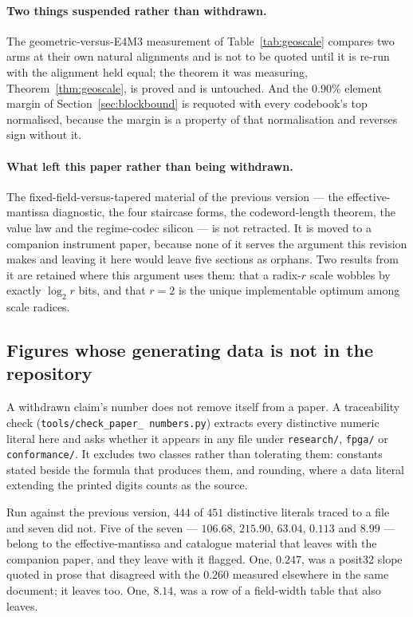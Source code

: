 \documentclass[11pt]{article}
\theoremstyle{definition}
\begin{document}
\paragraph{Two things suspended rather than withdrawn.} The geometric-versus-E4M3
measurement of Table~\ref{tab:geoscale} compares two arms at their own natural
alignments and is not to be quoted until it is re-run with the alignment held
equal; the theorem it was measuring, Theorem~\ref{thm:geoscale}, is proved and is
untouched. And the $0.90\%$ element margin of Section~\ref{sec:blockbound} is
requoted with every codebook's top normalised, because the margin is a property
of that normalisation and reverses sign without it.

\paragraph{What left this paper rather than being withdrawn.} The
fixed-field-versus-tapered material of the previous version --- the
effective-mantissa diagnostic, the four staircase forms, the codeword-length
theorem, the value law and the regime-codec silicon --- is not retracted. It is
moved to a companion instrument paper, because none of it serves the argument
this revision makes and leaving it here would leave five sections as orphans.
Two results from it are retained where this argument uses them: that a radix-$r$
scale wobbles by exactly $\log_2 r$ bits, and that $r=2$ is the unique
implementable optimum among scale radices.

\subsection{Figures whose generating data is not in the repository}
\label{sec:provenance}

A withdrawn claim's number does not remove itself from a paper. A traceability
check (\texttt{tools/\allowbreak check\_\allowbreak paper\_\allowbreak
numbers.py}) extracts every distinctive
numeric literal here and asks whether it appears in any file under
\texttt{research/}, \texttt{fpga/} or \texttt{conformance/}. It excludes two
classes rather than tolerating them: constants stated beside the formula that
produces them, and rounding, where a data literal extending the printed digits
counts as the source.

Run against the previous version, $444$ of $451$ distinctive literals traced to a
file and seven did not. Five of the seven --- $106.68$, $215.90$, $63.04$,
$0.113$ and $8.99$ --- belong to the effective-mantissa and catalogue material
that leaves with the companion paper, and they leave with it flagged. One,
$0.247$, was a posit32 slope quoted in prose that disagreed with the $0.260$
measured elsewhere in the same document; it leaves too. One, $8.14$, was a row of
a field-width table that also leaves.
\end{document}

